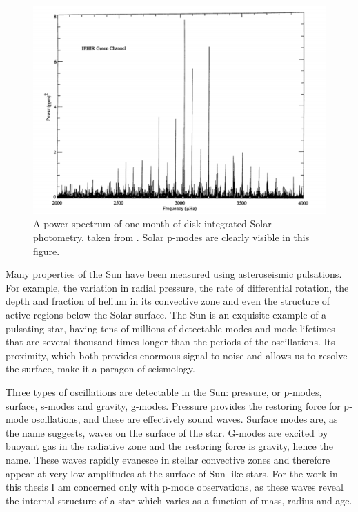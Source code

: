 \begin{figure}[p]
\begin{center}
\includegraphics[width=6in, clip=true]{figures/solar_spectrum.pdf}
\caption[Solar power spectrum.]{A power spectrum of one month of
disk-integrated Solar photometry, taken from \citet{toutain}.
Solar p-modes are clearly visible in this figure.}
\label{fig:solar_spectrum}
\end{center}
\end{figure}

Many properties of the Sun have been measured using asteroseismic pulsations.
For example, the variation in radial pressure, the rate of differential
rotation, the depth and fraction of helium in its convective zone and even the
structure of active regions below the Solar surface.
The Sun is an exquisite example of a pulsating star, having tens of millions
of detectable modes and mode lifetimes that are several thousand times longer
than the periods of the oscillations.
Its proximity, which both provides enormous signal-to-noise and allows us to
resolve the surface, make it a paragon of seismology.

Three types of oscillations are detectable in the Sun: pressure, or p-modes,
surface, s-modes and gravity, g-modes.
Pressure provides the restoring force for p-mode oscillations, and these are
effectively sound waves.
Surface modes are, as the name suggests, waves on the surface of the star.
G-modes are excited by buoyant gas in the radiative zone and the restoring
force is gravity, hence the name.
These waves rapidly evanesce in stellar convective zones and therefore
appear at very low amplitudes at the surface of Sun-like stars.
For the work in this thesis I am concerned only with p-mode observations, as
these waves reveal the internal structure of a star which varies as a function
of mass, radius and age.

